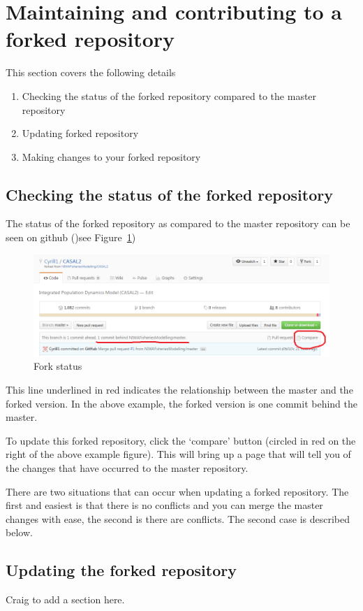 \section{Maintaining and contributing to a forked repository\label{sec:maintain_repo}}

This section covers the following details

\begin{enumerate}
	\item Checking the status of the forked repository compared to the master repository
	\item Updating forked repository
	\item Making changes to your forked repository
\end{enumerate}

\subsection{Checking the status of the forked repository}

The status of the forked repository as compared to the master repository can be seen on github ()see Figure~\ref{fig:fork_status})

\begin{figure}[!ht]
	\includegraphics[scale=0.6]{Figures/fork_status.png}
	\caption{Fork status}\label{fig:fork_status}
\end{figure}

This line underlined in red indicates the relationship between the master and the forked version. In the above example, the forked version is one commit behind the master. 

To update this forked repository, click the `compare' button (circled in red on the right of the above example figure). This will bring up a page that will tell you of the changes that have occurred to the master repository. 

There are two situations that can occur when updating a forked repository. The first and easiest is that there is no conflicts and you can merge the master changes with ease, the second is there are conflicts. The second case is described below.

\subsection{Updating the forked repository}

Craig to add a section here.
